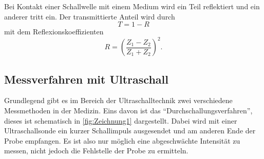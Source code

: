 Bei Kontakt einer Schallwelle mit einem Medium wird ein Teil reflektiert und ein anderer tritt ein.
Der transmittierte Anteil wird durch
\begin{equation}
    T = 1 - R
\end{equation}
mit dem Reflexionskoeffizienten
\begin{equation}
    R = \left( \frac{Z_1 - Z_2}{Z_1 + Z_2} \right)^2.
\end{equation}

\subsection{Messverfahren mit Ultraschall}

Grundlegend gibt es im Bereich der Ultraschalltechnik zwei verschiedene Messmethoden in der Medizin.
Eins davon ist das \enquote{Durchschallungsverfahren}, dieses ist schematisch in \autoref{fig:Zeichnung1} dargestellt.
Dabei wird mit einer Ultraschallsonde ein kurzer Schallimpuls ausgesendet und am anderen Ende der Probe empfangen.
Es ist also nur möglich eine abgeschwächte Intensität zu messen, nicht jedoch die Fehlstelle der Probe zu ermitteln. 

